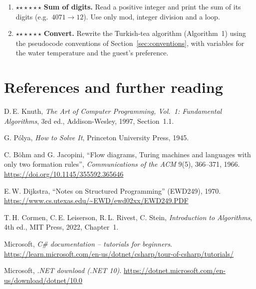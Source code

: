 \documentclass[11pt,a4paper]{article}
\newif\ifsolutions
\newcommand{\READ}{\textbf{READ}\ }
\newcommand{\PRINT}{\textbf{PRINT}\ }
\newcommand{\START}{\State \textbf{START}}
\newcommand{\STOP}{\State \textbf{END}}
\newcommand{\MOD}{\mathbin{\mathrm{mod}}}
\newcommand{\solution}[1]{\ifsolutions\begin{solbox}#1\end{solbox}\fi}
\newcommand{\stars}[1]{\textcolor{amberdk}{\ifcase#1\or$\star$\or$\star\star$\or$\star\star\star$\fi}}
\begin{document}
\begin{enumerate}[label=\textbf{P\arabic*.},leftmargin=*,itemsep=3pt]
{\begin{algorithmic}[1]
  \State \PRINT $max$ \STOP
  \end{algorithmic}
  Initialising $max$ with the \emph{first} number (not with $0$) makes the algorithm correct also when all numbers are negative.}
  \item \stars{3} \textbf{Sum of digits.} Read a positive integer and print the sum of its digits (e.g.\ $4071 \to 12$). Use only $\MOD$, integer division and a loop.
  \solution{
  \begin{algorithmic}[1]
  \START \State \READ $n$ \State $s \gets 0$
  \WhileX{$n > 0$} \State $s \gets s + (n \MOD 10)$ \State $n \gets \lfloor n/10 \rfloor$ \EndWhileX
  \State \PRINT $s$ \STOP
  \end{algorithmic}
  Trace $4071$: $n=4071,\,s=1$; $n=407,\,s=8$; $n=40,\,s=8$; $n=4,\,s=12$; $n=0$ stop.}
  \item \stars{3} \textbf{Convert.} Rewrite the Turkish-tea algorithm (Algorithm~1) using the pseudocode conventions of Section~\ref{sec:conventions}, with variables for the water temperature and the guest's preference.
\end{enumerate}

\section*{References and further reading}
\begin{enumerate}[label={[\arabic*]},leftmargin=*,itemsep=1pt,font=\small]\small
  \item D.\,E. Knuth, \emph{The Art of Computer Programming, Vol.~1: Fundamental Algorithms}, 3rd ed., Addison-Wesley, 1997, Section~1.1.
  \item G. P\'olya, \emph{How to Solve It}, Princeton University Press, 1945.
  \item C. B\"ohm and G. Jacopini, ``Flow diagrams, Turing machines and languages with only two formation rules'', \emph{Communications of the ACM} 9(5), 366--371, 1966. \url{https://doi.org/10.1145/355592.365646}
  \item E.\,W. Dijkstra, ``Notes on Structured Programming'' (EWD249), 1970. \url{https://www.cs.utexas.edu/~EWD/ewd02xx/EWD249.PDF}
  \item T.\,H. Cormen, C.\,E. Leiserson, R.\,L. Rivest, C. Stein, \emph{Introduction to Algorithms}, 4th ed., MIT Press, 2022, Chapter~1.
  \item Microsoft, \emph{C\# documentation -- tutorials for beginners}. \url{https://learn.microsoft.com/en-us/dotnet/csharp/tour-of-csharp/tutorials/}
  \item Microsoft, \emph{.NET download (.NET 10)}. \url{https://dotnet.microsoft.com/en-us/download/dotnet/10.0}
\end{enumerate}
\end{document}
